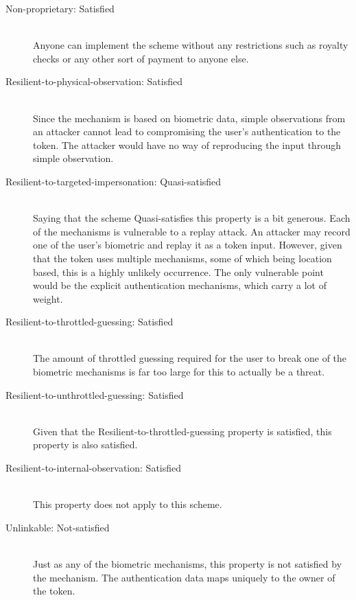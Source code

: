 \begin{description}
  \item[Non-proprietary: Satisfied] \hfill \\
  Anyone can implement the scheme without any restrictions such as royalty checks or any other sort of payment to anyone else.
  
  \item[Resilient-to-physical-observation: Satisfied] \hfill \\
  Since the mechanism is based on biometric data, simple observations from an attacker cannot lead to compromising the user's authentication to the token. The attacker would have no way of reproducing the input through simple observation.
  
  \item[Resilient-to-targeted-impersonation: Quasi-satisfied] \hfill \\
  Saying that the scheme Quasi-satisfies this property is a bit generous. Each of the mechanisms is vulnerable to a replay attack. An attacker may record one of the user's biometric and replay it as a token input. However, given that the token uses multiple mechanisms, some of which being location based, this is a highly unlikely occurrence. The only vulnerable point would be the explicit authentication mechanisms, which carry a lot of weight.
  
  \item[Resilient-to-throttled-guessing: Satisfied] \hfill \\
  The amount of throttled guessing required for the user to break one of the biometric mechanisms is far too large for this to actually be a threat.
  
  \item[Resilient-to-unthrottled-guessing: Satisfied] \hfill \\
  Given that the Resilient-to-throttled-guessing property is satisfied, this property is also satisfied.
  
  \item[Resilient-to-internal-observation: Satisfied] \hfill \\
  This property does not apply to this scheme. 
  
  \item[Unlinkable: Not-satisfied] \hfill \\
  Just as any of the biometric mechanisms, this property is not satisfied by the mechanism. The authentication data maps uniquely to the owner of the token.
  

\end{description}
